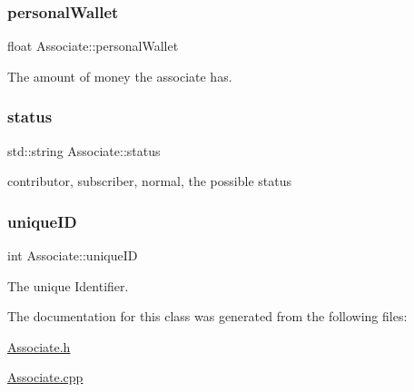 \subsubsection{\texorpdfstring{personal\+Wallet}{personalWallet}}
{\footnotesize\ttfamily float Associate\+::personal\+Wallet\hspace{0.3cm}{\ttfamily [private]}}



The amount of money the associate has. 

\mbox{\label{classAssociate_aacf79a4e389c7db3d8636b788cb2089f}} 
\subsubsection{\texorpdfstring{status}{status}}
{\footnotesize\ttfamily std\+::string Associate\+::status\hspace{0.3cm}{\ttfamily [private]}}



contributor, subscriber, normal, the possible status 

\mbox{\label{classAssociate_a55a1f311ac7cb8020e9631f283cb74e6}} 
\subsubsection{\texorpdfstring{unique\+ID}{uniqueID}}
{\footnotesize\ttfamily int Associate\+::unique\+ID\hspace{0.3cm}{\ttfamily [private]}}



The unique Identifier. 



The documentation for this class was generated from the following files\+:\begin{DoxyCompactItemize}
\item 
\mbox{\hyperlink{Associate_8h}{Associate.\+h}}\item 
\mbox{\hyperlink{Associate_8cpp}{Associate.\+cpp}}\end{DoxyCompactItemize}
